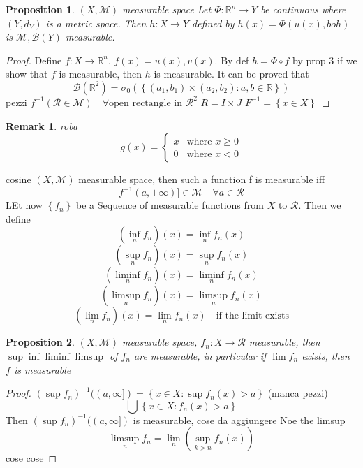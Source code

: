 \documentclass[a4paper,12pt]{article}
\theoremstyle{break}
\newtheorem{proposition}{Proposition}[section]
\newtheorem{remark}[section]{Remark}
\numberwithin{equation}{section}
\begin{document}
\begin{proposition}
    \((X, \mathcal{M})\) measurable space 
    Let \(\Phi : \mathbb{R}^n \to Y\) be continuous where \((Y, d_Y)\) is a metric space. Then \(h: X\to Y\) defined by \(h(x) = \Phi(u(x), boh)\) is \(\mathcal{M}, \mathcal{B}(Y)\)-measurable.
\end{proposition}
\begin{proof}
    Define \(f: X \to \mathbb{R}^n\), \(f(x) = u(x), v(x)\). By def \(h = \Phi \circ f\) by prop 3 if we show that \(f\) is measurable, then \(h\) is measurable. It can be proved that \[\mathcal{B}(\mathbb{R}^2) = \sigma_0 \left(\left\lbrace (a_1, b_1) \times (a_2, b_2): a,b \in \mathbb{R}\right\rbrace\right)\]
    pezzi
    \(f^{-1}(\mathcal{R} \in \mathcal{M}) \quad \forall \mbox{open rectangle in }\mathcal{R}^2\)
    \(R = I \times J\)
    \(F^{-1} = \left\lbrace x \in X \right\rbrace\) 
\end{proof}
\begin{remark}
    roba 
    \[
        g(x) = \begin{cases}
            x & \mbox{where } x \geq 0 \\
            0 & \mbox{where } x < 0
        \end{cases}
    \]
\end{remark}
cosine 
\((X,\mathcal{M})\) measurable space, then such a  function f is measurable iff
\[
    f^{-1}(a, +\infty)] \in \mathcal{M} \quad \forall a \in \mathcal{R}
\]
LEt now \(\left\lbrace f_n \right\rbrace\) be a Sequence of measurable functions from \(X\) to \(\bar{\mathcal{R}}\). Then we define \[
    (\inf_n f_n)(x) = \inf_n f_n(x)
\]
\[
    (\sup_n f_n)(x) = \sup_n f_n(x)
\]
\[
    (\liminf_n f_n)(x) = \liminf_n f_n(x)
\]
\[
    (\limsup_n f_n)(x) = \limsup_n f_n(x)
\]
\[
    (\lim_n f_n)(x) = \lim_n f_n(x) \quad \mbox{if the limit exists}
\]
\begin{proposition}
    \((X, \mathcal{M})\) measurable space, \(f_n : X \to \bar{\mathcal{R}}\) measurable, then 
    \(\sup \inf \liminf \limsup\) of \(f_n\) are measurable, in particular if \(\lim f_n\) exists, then \(f\) is measurable
\end{proposition}
\begin{proof}
    \((\sup f_n)^{-1} ((a, \infty]) = \left\lbrace x \in X : \sup f_n(x) > a \right\rbrace\) (manca pezzi)
    \[
        \bigcup \left\lbrace x \in X : f_n(x) > a \right\rbrace
    \]
    Then \((\sup f_n)^{-1} ((a, \infty])\) is measurable, cose da aggiungere
Noe the limsup
\[\limsup_n f_n = \lim_n (\sup_{k > n} f_n(x))\]
cose cose 
\end{proof}
\end{document}
